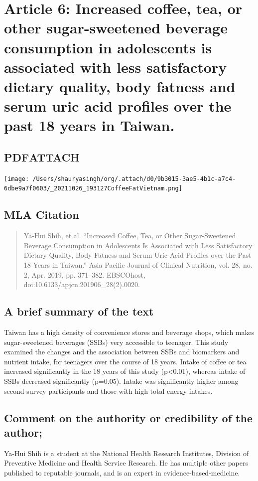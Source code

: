 \documentclass{scrartcl}
\begin{document}
\section{Article 6: Increased coffee, tea, or other sugar-sweetened beverage consumption in adolescents is associated with less satisfactory dietary quality, body fatness and serum uric acid profiles over the past 18 years in Taiwan.}
\label{sec:org66f2c43}
\subsection{PDF\hfill{}\textsc{ATTACH}}
\label{sec:org72d3cd2}
\begin{center}
\texttt{[image: /Users/shauryasingh/org/.attach/d0/9b3015-3ae5-4b1c-a7c4-6dbe9a7f0603/\_20211026\_193127CoffeeFatVietnam.png]}
\end{center}

\subsection{MLA Citation}
\label{sec:orga3d5676}
\begin{quote}
Ya-Hui Shih, et al. “Increased Coffee, Tea, or Other Sugar-Sweetened Beverage Consumption in Adolescents Is Associated with Less Satisfactory Dietary Quality, Body Fatness and Serum Uric Acid Profiles over the Past 18 Years in Taiwan.” Asia Pacific Journal of Clinical Nutrition, vol. 28, no. 2, Apr. 2019, pp. 371–382. EBSCOhost, doi:10.6133/apjcn.201906\_28(2).0020.
\end{quote}
\subsection{A brief summary of the text}
\label{sec:orgb52c5e1}
Taiwan has a high density of convenience stores and beverage shops, which makes sugar-sweetened beverages (SSBs) very accessible to teenager. This study examined the changes and the association between SSBs and biomarkers and nutrient intake, for teenagers over the course of 18 years. Intake of coffee or tea increased significantly in the 18 years of this study (p<0.01), whereas intake of SSBs decreased significantly (p=0.05). Intake was significantly higher among second survey participants and those with high total energy intakes.
\subsection{Comment on the authority or credibility of the author;}
\label{sec:org2c471fa}
Ya-Hui Shih is a student at the National Health Research Institutes, Division of Preventive Medicine and Health Service Research. He has multiple other papers published to reputable journals, and is an expert in evidence-based-medicine.
\end{document}
